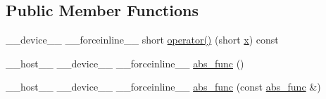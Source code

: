 \subsection*{Public Member Functions}
\begin{DoxyCompactItemize}
\item 
\-\_\-\-\_\-device\-\_\-\-\_\- \-\_\-\-\_\-forceinline\-\_\-\-\_\- short \hyperlink{structcv_1_1gpu_1_1device_1_1abs__func_3_01short_01_4_a3423df7320437f4fd534c51ac0e29586}{operator()} (short \hyperlink{highgui__c_8h_a6150e0515f7202e2fb518f7206ed97dc}{x}) const 
\item 
\-\_\-\-\_\-host\-\_\-\-\_\- \-\_\-\-\_\-device\-\_\-\-\_\- \-\_\-\-\_\-forceinline\-\_\-\-\_\- \hyperlink{structcv_1_1gpu_1_1device_1_1abs__func_3_01short_01_4_a7a79e89d46f5cdb9002cbe68630eb5d7}{abs\-\_\-func} ()
\item 
\-\_\-\-\_\-host\-\_\-\-\_\- \-\_\-\-\_\-device\-\_\-\-\_\- \-\_\-\-\_\-forceinline\-\_\-\-\_\- \hyperlink{structcv_1_1gpu_1_1device_1_1abs__func_3_01short_01_4_aba1e209d33acab149f95b2943cfe40e6}{abs\-\_\-func} (const \hyperlink{structcv_1_1gpu_1_1device_1_1abs__func}{abs\-\_\-func} \&)
\end{DoxyCompactItemize}


